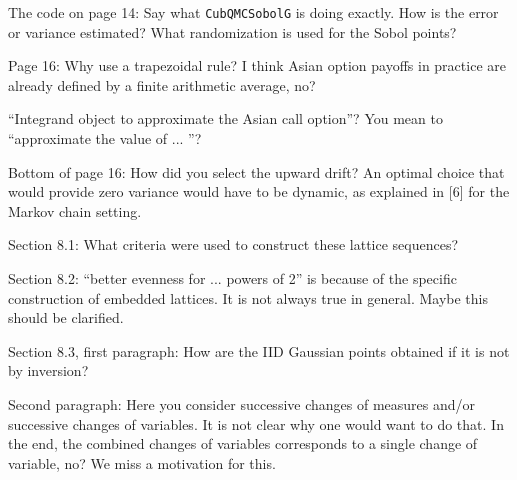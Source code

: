 \documentclass{amsart}
\begin{document}
The code on page 14: Say what \texttt{CubQMCSobolG} is doing exactly. How is the error or variance estimated? What randomization is used for the Sobol points?

\vspace{1cm}

Page 16: Why use a trapezoidal rule? I think Asian option payoffs in practice are already defined by a finite arithmetic average, no?

\vspace{1cm}

``Integrand object to approximate the Asian call option''? You mean to ``approximate the value of ... ''?

\vspace{1cm}

Bottom of page 16: How did you select the upward drift? An optimal choice that would provide zero variance would have to be dynamic, as explained in [6] for the Markov chain
setting.

\vspace{1cm}

Section 8.1: What criteria were used to construct these lattice sequences?

\vspace{1cm}

Section 8.2: “better evenness for ... powers of 2” is because of the specific construction of embedded lattices. It is not always true in general. Maybe this should be clarified.

\vspace{1cm}

Section 8.3, first paragraph: How are the IID Gaussian points obtained if it is not by inversion?

\vspace{1cm}

Second paragraph: Here you consider successive changes of measures and/or successive changes of variables. It is not clear why one would want to do that. In the end, the combined changes of variables corresponds to a single change of variable, no? We miss a motivation for this.
\end{document}
